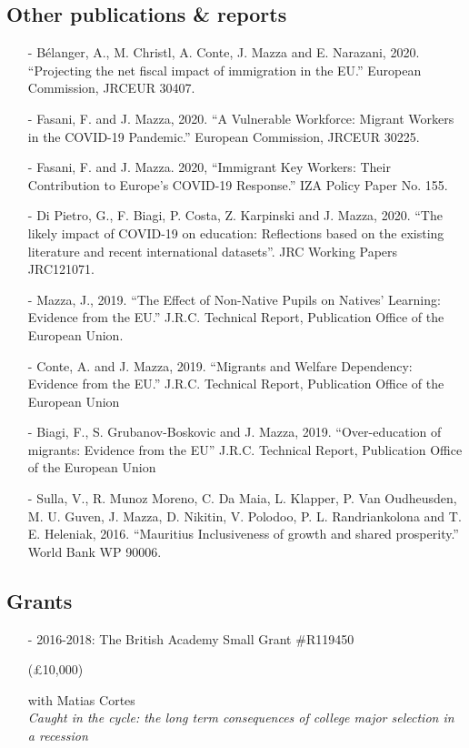 \documentclass[11pt]{article}
\begin{document}
\subsection*{\sc Other publications \& reports}

\begin{itemize}[itemsep=0pt, leftmargin=20pt]
\item [-]B\'elanger, A., M. Christl, A. Conte, J. Mazza and E. Narazani, 2020. {``Projecting the net fiscal impact of immigration in the EU.''}
European Commission, JRC\textendash EUR 30407.
\item [-]Fasani, F. and J. Mazza, 2020. {``A Vulnerable Workforce: Migrant Workers in the COVID-19 Pandemic.''}
European Commission, JRC\textendash EUR 30225.
\item [-]Fasani, F. and J. Mazza. 2020, {``Immigrant Key Workers: Their Contribution to Europe's COVID-19 Response.''} IZA Policy Paper No. 155.
\item [-]Di Pietro, G., F. Biagi, P. Costa, Z. Karpinski and J. Mazza, 2020. {``The likely impact of COVID-19 on education: Reflections based on the existing literature and recent international datasets''}. JRC Working Papers JRC121071.
\item [-]Mazza, J., 2019. ``{The Effect of Non-Native Pupils on Natives' Learning: Evidence from the EU}.''
J.R.C. Technical Report, Publication Office of the European Union.
\item [-]Conte, A. and J. Mazza, 2019. ``{Migrants and Welfare Dependency: Evidence from the EU}.''
J.R.C. Technical Report, Publication Office of the European Union
\item [-]Biagi, F., S. Grubanov-Boskovic and J. Mazza,
2019. ``Over-education of migrants: Evidence from the EU'' J.R.C. Technical Report, Publication Office of the European Union
\item [-]Sulla, V., R. Munoz Moreno, C. Da Maia, L. Klapper, P. Van Oudheusden, M. U. Guven, J. Mazza, D. Nikitin, V. Polodoo, P. L. Randriankolona and T. E. Heleniak, 2016.
``{Mauritius \textendash Inclusiveness of growth and shared prosperity}.'' World Bank WP 90006.

\end{itemize}

\subsection*{\sc Grants }

\begin{itemize}[itemsep=0pt, leftmargin=20pt]
\item [-]2016-2018: The British Academy Small Grant \#R119450
\begin{money}
(\pounds10,000)
\end{money}
with Matias Cortes \\
\emph{Caught in the cycle: the long term consequences of college major selection in a recession}

\end{itemize}
\end{document}
